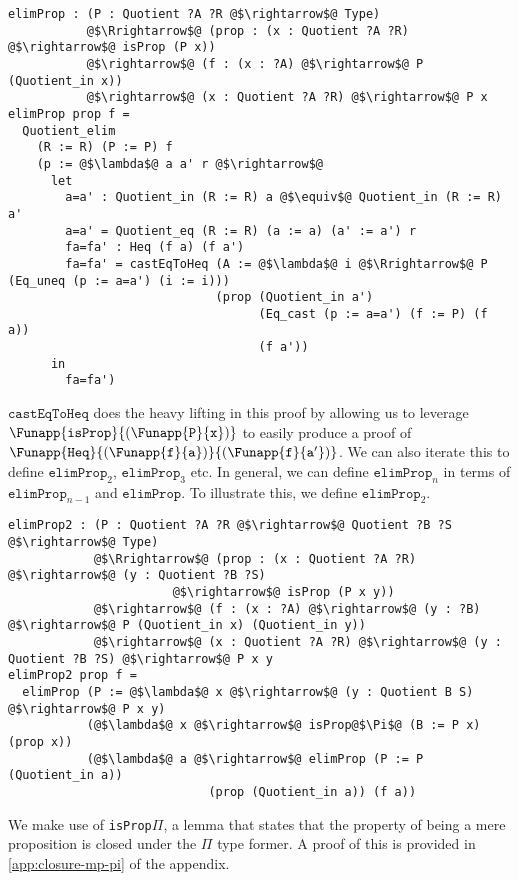 \documentclass[12pt,twoside,maitrise]{dms}
\theoremstyle{definition}
\numberwithin{equation}{section}
\numberwithin{table}{chapter}
\numberwithin{figure}{chapter}
\newcommand\id[1] {\texttt{#1}}
\newcommand\fn[1] {\texttt{#1}}
\begin{document}
\begin{verbatim}
elimProp : (P : Quotient ?A ?R @$\rightarrow$@ Type)
           @$\Rrightarrow$@ (prop : (x : Quotient ?A ?R) @$\rightarrow$@ isProp (P x))
           @$\rightarrow$@ (f : (x : ?A) @$\rightarrow$@ P (Quotient_in x))
           @$\rightarrow$@ (x : Quotient ?A ?R) @$\rightarrow$@ P x
elimProp prop f =
  Quotient_elim
    (R := R) (P := P) f
    (p := @$\lambda$@ a a' r @$\rightarrow$@
      let
        a=a' : Quotient_in (R := R) a @$\equiv$@ Quotient_in (R := R) a'
        a=a' = Quotient_eq (R := R) (a := a) (a' := a') r
        fa=fa' : Heq (f a) (f a')
        fa=fa' = castEqToHeq (A := @$\lambda$@ i @$\Rrightarrow$@ P (Eq_uneq (p := a=a') (i := i)))
                             (prop (Quotient_in a')
                                   (Eq_cast (p := a=a') (f := P) (f a))
                                   (f a'))
      in
        fa=fa')
\end{verbatim}

$\fn{castEqToHeq}$ does the heavy lifting in this proof by allowing us to leverage $\Funapp{\fn{isProp}}{(\Funapp{\id{P}}{\id{x}})}$ to easily produce a proof of $\Funapp{\id{Heq}}{(\Funapp{\id{f}}{\id{a}})}{(\Funapp{\id{f}}{\id{a}'})}$. We can also iterate this to define $\fn{elimProp}_2$, $\fn{elimProp}_3$ etc. In general, we can define $\fn{elimProp}_n$ in terms of $\fn{elimProp}_{n-1}$ and $\fn{elimProp}$. To illustrate this, we define $\fn{elimProp}_2$.

\begin{verbatim}
elimProp2 : (P : Quotient ?A ?R @$\rightarrow$@ Quotient ?B ?S @$\rightarrow$@ Type)
            @$\Rrightarrow$@ (prop : (x : Quotient ?A ?R) @$\rightarrow$@ (y : Quotient ?B ?S)
                       @$\rightarrow$@ isProp (P x y))
            @$\rightarrow$@ (f : (x : ?A) @$\rightarrow$@ (y : ?B) @$\rightarrow$@ P (Quotient_in x) (Quotient_in y))
            @$\rightarrow$@ (x : Quotient ?A ?R) @$\rightarrow$@ (y : Quotient ?B ?S) @$\rightarrow$@ P x y
elimProp2 prop f =
  elimProp (P := @$\lambda$@ x @$\rightarrow$@ (y : Quotient B S) @$\rightarrow$@ P x y)
           (@$\lambda$@ x @$\rightarrow$@ isProp@$\Pi$@ (B := P x) (prop x))
           (@$\lambda$@ a @$\rightarrow$@ elimProp (P := P (Quotient_in a))
                            (prop (Quotient_in a)) (f a))
\end{verbatim}

We make use of \id{isProp$\Pi$}, a lemma that states that the property of being
a mere proposition is closed under the $\Pi$ type former. A proof of this is
provided in \autoref{app:closure-mp-pi} of the appendix.
\end{document}
